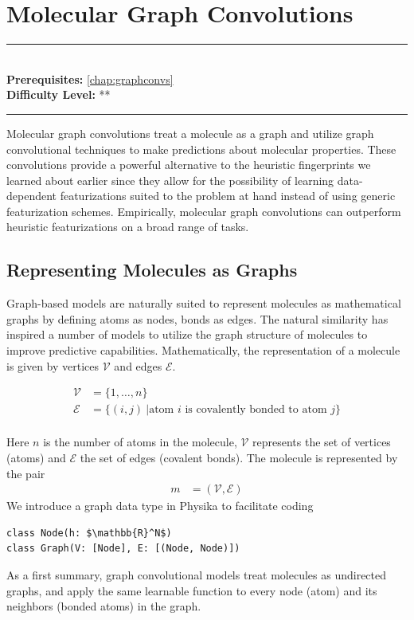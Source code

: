\documentclass[book.tex]{subfiles}
\begin{document}
\chapter{Molecular Graph Convolutions}

\label{chap:molecular_graphconvs}
\noindent\rule{11cm}{0.4pt} \\
\textbf{Prerequisites:} \autoref{chap:graphconvs} \\
\textbf{Difficulty Level:} ** \\
\noindent\rule{11cm}{0.4pt}
\vspace{5mm}

Molecular graph convolutions treat a molecule as a graph and utilize graph convolutional techniques to make predictions about molecular properties. These convolutions provide a powerful alternative to the heuristic fingerprints we learned about earlier since they allow for the possibility of learning data-dependent featurizations suited to the problem at hand instead of using generic featurization schemes. Empirically, molecular graph convolutions can outperform heuristic featurizations on a broad range of tasks.

\section{Representing Molecules as Graphs}
Graph-based models are naturally suited to represent molecules as mathematical graphs by defining atoms as nodes, bonds as edges. The natural similarity has inspired a number of models to utilize the graph structure of molecules to improve predictive capabilities\cite{gilmer2017neural}. Mathematically, the representation of a molecule is given by vertices $\mathcal{V}$ and edges $\mathcal{E}$.

\begin{align}
\mathcal{V} &= \{1, \dotsc, n\}\\
\mathcal{E} &= \{(i, j)\ | \textrm{atom $i$ is covalently bonded to atom $j$}\} \\
\end{align}

Here $n$ is the number of atoms in the molecule, $\mathcal{V}$ represents the set of vertices (atoms) and $\mathcal{E}$ the set of edges (covalent bonds). The molecule is represented by the pair
\begin{align}
m &= (\mathcal{V}, \mathcal{E})
\end{align}
We introduce a graph data type in Physika to facilitate coding
\begin{lstlisting}
class Node(h: $\mathbb{R}^N$)
class Graph(V: [Node], E: [(Node, Node)])
\end{lstlisting}
As a first summary, graph convolutional models treat molecules as undirected graphs, and apply the same learnable function to every node (atom) and its neighbors (bonded atoms) in the graph.
\end{document}
